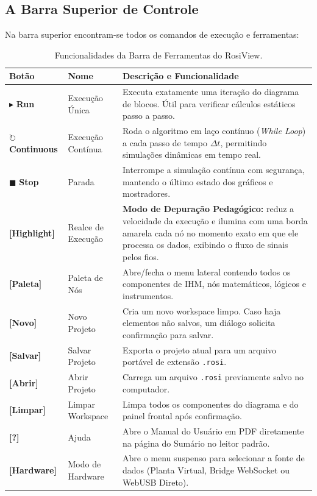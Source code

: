 \documentclass[11pt,a4paper]{article}
\begin{document}
\subsection{A Barra Superior de Controle}
Na barra superior encontram-se todos os comandos de execução e ferramentas:

\begin{table}[h!]
\centering
\small
\begin{tabular}{@{}llp{9.8cm}@{}}
\toprule
\textbf{Botão} & \textbf{Nome} & \textbf{Descrição e Funcionalidade} \\ \midrule
$\blacktriangleright$ \textbf{Run} & Execução Única & Executa exatamente uma iteração do diagrama de blocos. Útil para verificar cálculos estáticos passo a passo. \\
$\circlearrowright$ \textbf{Continuous} & Execução Contínua & Roda o algoritmo em laço contínuo (\textit{While Loop}) a cada passo de tempo $\Delta t$, permitindo simulações dinâmicas em tempo real. \\
$\blacksquare$ \textbf{Stop} & Parada & Interrompe a simulação contínua com segurança, mantendo o último estado dos gráficos e mostradores. \\
\textbf{[Highlight]} & Realce de Execução & \textbf{Modo de Depuração Pedagógico:} reduz a velocidade da execução e ilumina com uma borda amarela cada nó no momento exato em que ele processa os dados, exibindo o fluxo de sinais pelos fios. \\
\textbf{[Paleta]} & Paleta de Nós & Abre/fecha o menu lateral contendo todos os componentes de IHM, nós matemáticos, lógicos e instrumentos. \\
\textbf{[Novo]} & Novo Projeto & Cria um novo workspace limpo. Caso haja elementos não salvos, um diálogo solicita confirmação para salvar. \\
\textbf{[Salvar]} & Salvar Projeto & Exporta o projeto atual para um arquivo portável de extensão \texttt{.rosi}. \\
\textbf{[Abrir]} & Abrir Projeto & Carrega um arquivo \texttt{.rosi} previamente salvo no computador. \\
\textbf{[Limpar]} & Limpar Workspace & Limpa todos os componentes do diagrama e do painel frontal após confirmação. \\
\textbf{[?]} & Ajuda & Abre o Manual do Usuário em PDF diretamente na página do Sumário no leitor padrão. \\
\textbf{[Hardware]} & Modo de Hardware & Abre o menu suspenso para selecionar a fonte de dados (Planta Virtual, Bridge WebSocket ou WebUSB Direto). \\
\bottomrule
\end{tabular}
\caption{Funcionalidades da Barra de Ferramentas do RosiView.}
\end{table}
\end{document}
